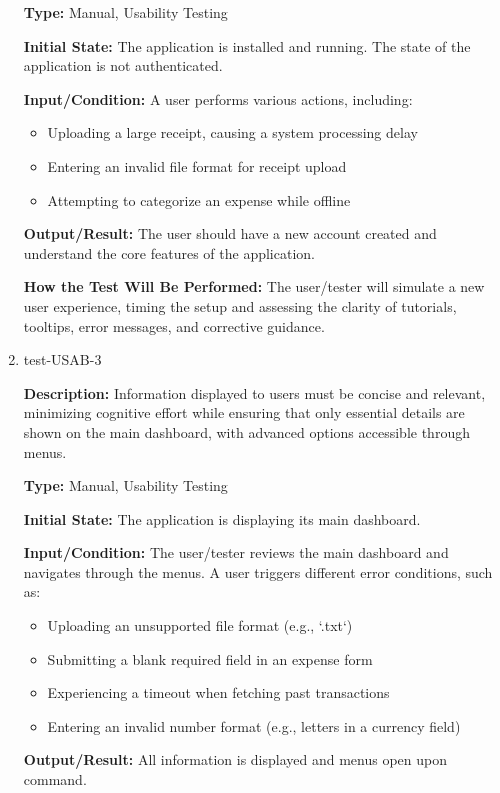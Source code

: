 \documentclass[12pt, titlepage]{article}
\begin{document}
\begin{enumerate}
\textbf{Type:} Manual, Usability Testing
					
\textbf{Initial State:} The application is installed and running. The state of
the application is not authenticated.
					
\textbf{Input/Condition:} A user performs various actions, including:
  \begin{itemize}
      \item Uploading a large receipt, causing a system processing delay
      \item Entering an invalid file format for receipt upload
      \item Attempting to categorize an expense while offline
  \end{itemize}
					
\textbf{Output/Result:} The user should have a new account created and
understand the core features of the application.
					
\textbf{How the Test Will Be Performed:} The user/tester will simulate a new
user experience, timing the setup and assessing the clarity of tutorials,
tooltips, error messages, and corrective guidance.

\item{test-USAB-3\\}

\textbf{Description:} Information displayed to users must be concise and
relevant, minimizing cognitive effort while ensuring that only essential details
are shown on the main dashboard, with advanced options accessible through menus.

\textbf{Type:} Manual, Usability Testing
					
\textbf{Initial State:} The application is displaying its main dashboard.
					
\textbf{Input/Condition:} The user/tester reviews the main dashboard and
navigates through the menus. A user triggers different error conditions, such as:
  \begin{itemize}
      \item Uploading an unsupported file format (e.g., `.txt`)
      \item Submitting a blank required field in an expense form
      \item Experiencing a timeout when fetching past transactions
      \item Entering an invalid number format (e.g., letters in a currency field)
  \end{itemize}
					
\textbf{Output/Result:} All information is displayed and menus open upon
command.
					

\end{enumerate}
\end{document}
